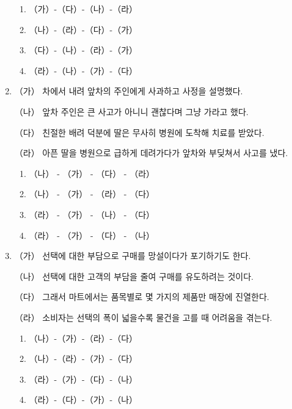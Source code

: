 \documentclass[12pt]{article}
\begin{document}
\begin{enumerate}[1.]
    \begin{enumerate}[1)]
        \item （가）-（다）-（나）-（라）
        \item （나）-（라）-（다）-（가）
        \item （다）-（나）-（라）-（가）
        \item （라）-（나）-（가）-（다）
    \end{enumerate}


    \item
    \begin{mdframed}
    （가） 차에서 내려 앞차의 주인에게 사과하고 사정을 설명했다.

    （나） 앞차 주인은 큰 사고가 아니니 괜찮다며 그냥 가라고 했다.

    （다） 친절한 배려 덕분에 딸은 무사히 병원에 도착해 치료를 받았다.

    （라） 아픈 딸을 병원으로 급하게 데려가다가 앞차와 부딪쳐서 사고를 냈다.
    \end{mdframed}

    \begin{enumerate}[1)]
        \item （나） - （가） - （다） - （라）
        \item （나） - （가） - （라） - （다）
        \item （라） - （가） - （나） - （다）
        \item （라） - （가） - （다） - （나）
    \end{enumerate}


    \item

    \begin{mdframed}
    （가） 선택에 대한 부담으로 구매를 망설이다가 포기하기도 한다.

    （나） 선택에 대한 고객의 부담을 줄여 구매를 유도하려는 것이다.

    （다） 그래서 마트에서는 품목별로 몇 가지의 제품만 매장에 진열한다.

    （라） 소비자는 선택의 폭이 넓을수록 물건을 고를 때 어려움을 겪는다.
    \end{mdframed}

    \begin{enumerate}[1)]
        \item （나）-（가）-（라）-（다）
        \item （나）-（라）-（가）-（다）
        \item （라）-（가）-（다）-（나）
        \item （라）-（다）-（가）-（나）
    \end{enumerate}





\end{enumerate}
\end{document}
